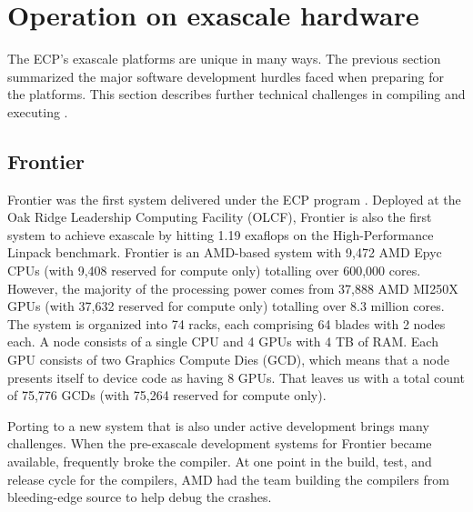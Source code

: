 \section{Operation on exascale hardware}

The ECP's exascale platforms are unique in many ways.
The previous section summarized the major software development hurdles faced when preparing for the platforms.
This section describes further technical challenges in compiling and executing \vtkm.


\subsection{Frontier}
Frontier was the first system delivered under the ECP program \citep{Atchley2023}. Deployed at the Oak Ridge Leadership Computing Facility (OLCF), Frontier is also the first system to achieve exascale by hitting 1.19 exaflops on the High-Performance Linpack benchmark.
Frontier is an AMD-based system with 9,472 AMD Epyc CPUs (with 9,408 reserved for compute only) totalling over 600,000 cores.
However, the majority of the processing power comes from 37,888 AMD MI250X GPUs (with 37,632 reserved for compute only) totalling over 8.3 million cores.
The system is organized into 74 racks, each comprising 64 blades with 2 nodes each.
A node consists of a single CPU and 4 GPUs with 4 TB of RAM.
Each GPU consists of two Graphics Compute Dies (GCD), which means that a node presents itself to device code as having 8 GPUs.
That leaves us with a total count of 75,776 GCDs (with 75,264 reserved for compute only).

Porting to a new system that is also under active development brings many challenges.
When the pre-exascale development systems for Frontier became available, \vtkm frequently broke the compiler.
At one point in the build, test, and release cycle for the compilers, AMD had the \vtkm team building the compilers from bleeding-edge source to help debug the crashes.

